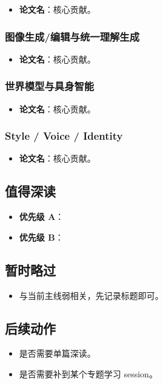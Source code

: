 \begin{itemize}[leftmargin=1.5em]
  \item \textbf{论文名}：核心贡献。
\end{itemize}

\subsubsection{图像生成/编辑与统一理解生成}

\begin{itemize}[leftmargin=1.5em]
  \item \textbf{论文名}：核心贡献。
\end{itemize}

\subsubsection{世界模型与具身智能}

\begin{itemize}[leftmargin=1.5em]
  \item \textbf{论文名}：核心贡献。
\end{itemize}

\subsubsection{Style / Voice / Identity}

\begin{itemize}[leftmargin=1.5em]
  \item \textbf{论文名}：核心贡献。
\end{itemize}

\subsection{值得深读}

\begin{itemize}[leftmargin=1.5em]
  \item \textbf{优先级 A}：
  \item \textbf{优先级 B}：
\end{itemize}

\subsection{暂时略过}

\begin{itemize}[leftmargin=1.5em]
  \item 与当前主线弱相关，先记录标题即可。
\end{itemize}

\subsection{后续动作}

\begin{itemize}[leftmargin=1.5em]
  \item 是否需要单篇深读。
  \item 是否需要补到某个专题学习 session。
\end{itemize}
